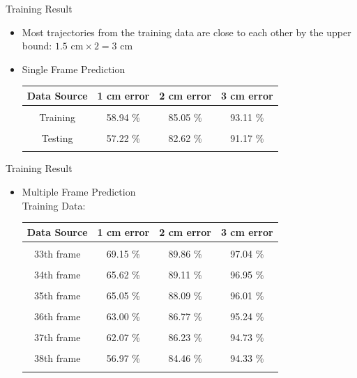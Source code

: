 \documentclass{beamer}
\begin{document}
	\begin{frame}{Training Result}
	\begin{itemize}
	\item {Most trajectories from the training data are close to each other by the upper bound: $1.5 \text{ cm} \times 2 = 3 \text{ cm}$}
	\item {Single Frame Prediction}
	\begin{center}
	\begin{tabular}{ c c c c }
	\hline 
	\rowcolor{LightCyan}
	Data Source & 1 cm error & 2 cm error & 3 cm error \\
	\hline \\[-1em]
	Training & 58.94 \% & 85.05 \% & 93.11 \% \\ \\[-1em]
	Testing & 57.22 \% & 82.62 \% & 91.17 \% \\ \\[-1em]
	\hline
	\end{tabular}
	\end{center}
	\end{itemize}
	\end{frame}

	\begin{frame}{Training Result}
	\begin{itemize}
	\item {Multiple Frame Prediction \\	{\color{blue}Training Data}:}
	\begin{center}
	\begin{tabular}{ c c c c }
	\hline
	\rowcolor{LightCyan}
	Data Source & 1 cm error & 2 cm error & 3 cm error \\
	\hline \\[-1em]
	33th frame & 69.15 \% & 89.86 \% & 97.04 \% \\ \\[-1em]
	34th frame & 65.62 \% & 89.11 \% & 96.95 \% \\ \\[-1em]
	35th frame & 65.05 \% & 88.09 \% & 96.01 \% \\ \\[-1em]
	36th frame & 63.00 \% & 86.77 \% & 95.24 \% \\ \\[-1em]
	37th frame & 62.07 \% & 86.23 \% & 94.73 \% \\ \\[-1em]
	38th frame & 56.97 \% & 84.46 \% & 94.33 \% \\ \\[-1em]
	\hline
	\end{tabular}
	\end{center}
	\end{itemize}
	\end{frame}	 
	
\end{document}
